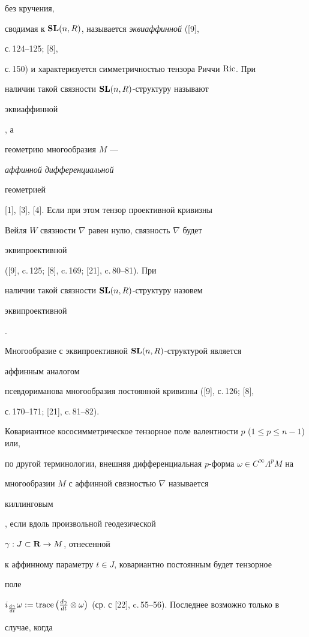 без кручения, 


сводимая к $\bold {SL}(n,R)$, называется {\it эквиаффинной} ([9], 


с.\,124--125; [8], 


с.\,150) и характеризуется симметричностью тензора Риччи $\operatorname{Ric}$. При 


наличии такой связности $\bold {SL}(n,R)$-структуру называют {\it 


эквиаффинной}, а 


геометрию многообразия $M$ --- {\it аффинной дифференциальной 


геометрией} [1], [3], [4]. Если при этом тензор проективной кривизны 


Вейля $W$ связности $\nabla$ равен нулю, связность $\nabla$ будет {\it 


эквипроективной} ([9], c.\,125; [8], c.\,169; [21], c.\,80--81). При 


наличии такой связности $\bold {SL}(n,R)$-структуру назовем {\it 


эквипроективной}. 


Многообразие с эквипроективной $\bold {SL}(n,R)$-структурой является 


аффинным аналогом 


псевдориманова многообразия постоянной кривизны ([9], с.\,126; [8], 


с.\,170--171; [21], c.\,81--82). 


 


Ковариантное кососимметрическое тензорное поле валентности $p$ ($1\le p\le 


n-1$) или, 


по другой терминологии, внешняя дифференциальная $p$-форма $\omega\in 


C^\infty\Lambda^p M$ на 


многообразии $M$ с аффинной связностью $\nabla$ называется {\it 


киллинговым}, если вдоль произвольной геодезической 


$\gamma:J\subset\bold R\to M$, отнесенной 


к аффинному параметру $t\in J$, ковариантно постоянным будет тензорное 


поле 


$i_{\frac{d\gamma}{dt}}\omega:=\trace\big(\frac{d\gamma}{dt}\otimes 


\omega \big)$ (ср. с [22], c.\,55--56). Последнее возможно только в 


случае, когда 


